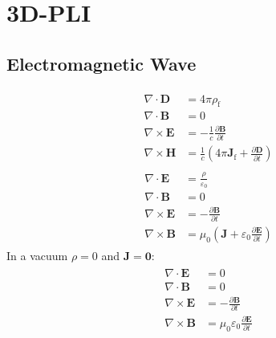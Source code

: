 \setcounter{chapter}{3}
\chapter{3D-PLI}
\label{sec:theory}
%
%
\section{Electromagnetic Wave}
% 
\begin{align} 
\begin{split} \label{eq::maxwell_macro}
    \nabla \cdot \mathbf{D} &= 4\pi\rho_\text{f}\\
    \nabla \cdot \mathbf{B} &= 0\\
    \nabla \times \mathbf{E} &= -\frac{1}{c} \frac{\partial \mathbf{B}} {\partial t}\\
    \nabla \times \mathbf{H} &= \frac{1}{c} \left(4\pi\mathbf{J}_\text{f} + \frac{\partial \mathbf{D}} {\partial t} \right)
\end{split}
\end{align}
% 
\begin{align} 
\begin{split} \label{eq::maxwell_general}
    \nabla \cdot \mathbf{E} &= \frac {\rho} {\varepsilon_0}\\
    \nabla \cdot \mathbf{B} &= 0\\
    \nabla \times \mathbf{E} &= -\frac{\partial \mathbf{B}} {\partial t}\\
    \nabla \times \mathbf{B} &= \mu_0\left(\mathbf{J} + \varepsilon_0 \frac{\partial \mathbf{E}} {\partial t} \right)
\end{split}
\end{align}
% 
In a vacuum $\rho = 0$ and $\mathbf{J} = \mathbf{0}$:
% 
\begin{align}
\begin{split} \label{eq::maxwell_vacuum}
  \nabla \cdot \mathbf{E} &= 0 \quad\\
  \nabla \cdot \mathbf{B} &= 0 \quad\\
  \nabla \times \mathbf{E} &= -\frac{\partial\mathbf B}{\partial t}\\
  \nabla \times \mathbf{B} &= \mu_0\varepsilon_0 \frac{\partial\mathbf E}{\partial t}
  \end{split}
\end{align}
